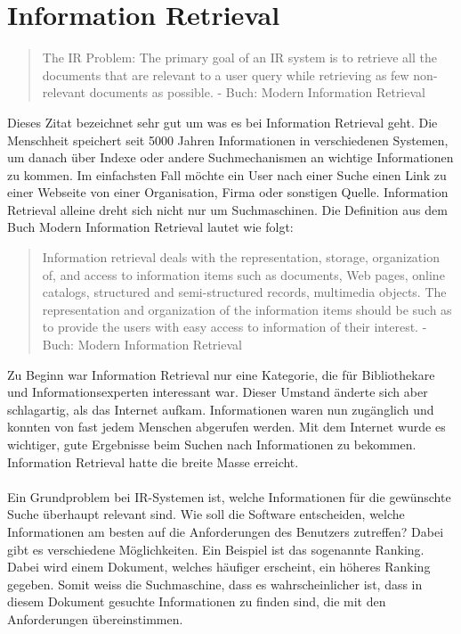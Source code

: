 \documentclass[12pt,a4paper,ngerman]{report}
\begin{document}
\section{Information Retrieval}
\begin{quote}
The IR Problem: The primary goal of an IR system is to retrieve all the documents that are relevant to a user query while retrieving as few non-relevant documents as possible. - Buch: Modern Information Retrieval
\end{quote}
Dieses Zitat bezeichnet sehr gut um was es bei Information Retrieval geht. Die Menschheit speichert seit 5000 Jahren Informationen in verschiedenen Systemen, um danach über Indexe oder andere Suchmechanismen an wichtige Informationen zu kommen. Im einfachsten Fall möchte ein User nach einer Suche einen Link zu einer Webseite von einer Organisation, Firma oder sonstigen Quelle. Information Retrieval alleine dreht sich nicht nur um Suchmaschinen. Die Definition aus dem Buch Modern Information Retrieval lautet wie folgt:
\begin{quote}
Information retrieval deals with the representation, storage, organization of, and access to information items such as documents, Web pages, online catalogs, structured and semi-structured records, multimedia objects. The representation and organization of the information items should be such as to provide the users with easy access to information of their interest. - Buch: Modern Information Retrieval
\end{quote}
Zu Beginn war Information Retrieval nur eine Kategorie, die für Bibliothekare und Informationsexperten interessant war. Dieser Umstand änderte sich aber schlagartig, als das Internet aufkam. Informationen waren nun zugänglich und konnten von fast jedem Menschen abgerufen werden. Mit dem Internet wurde es wichtiger, gute Ergebnisse beim Suchen nach Informationen zu bekommen. Information Retrieval hatte die breite Masse erreicht.\\
\\
Ein Grundproblem bei IR-Systemen ist, welche Informationen für die gewünschte Suche überhaupt relevant sind. Wie soll die Software entscheiden, welche Informationen am besten auf die Anforderungen des Benutzers zutreffen? Dabei gibt es verschiedene Möglichkeiten. Ein Beispiel ist das sogenannte Ranking. Dabei wird einem Dokument, welches häufiger erscheint, ein höheres Ranking gegeben. Somit weiss die Suchmaschine, dass es wahrscheinlicher ist, dass in diesem Dokument gesuchte Informationen zu finden sind, die mit den Anforderungen übereinstimmen.\\
\end{document}
